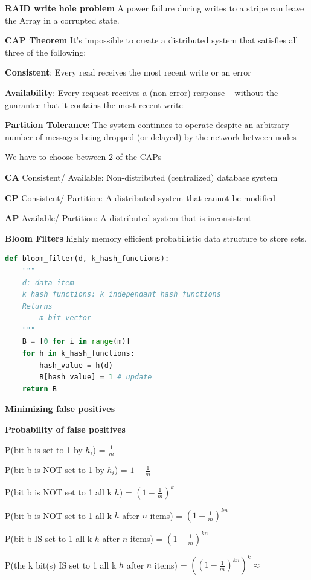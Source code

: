 \documentclass[a4paper,12pt]{article}
\begin{document}
\bigskip
\textbf{RAID write hole problem} A power failure during writes to a stripe can leave the Array
in a corrupted state.

\bigskip
\textbf{CAP Theorem} It's impossible to create a distributed system that satisfies all three of
the following:

\textbf{Consistent}: Every read receives the most recent write or an error

\textbf{Availability}: Every request receives a (non-error) response – without the guarantee that it contains the most recent write

\textbf{Partition Tolerance}: The system continues to operate despite an arbitrary number of messages being dropped (or delayed) by the network between nodes

\bigskip
We have to choose between 2 of the CAPs

\textbf{CA} Consistent/ Available: Non-distributed (centralized) database system

\textbf{CP} Consistent/ Partition: A distributed system that cannot be modified

\textbf{AP} Available/ Partition: A distributed system that is inconsistent

\bigskip
\textbf{Bloom Filters} highly memory efficient probabilistic data structure to store sets.
\begin{lstlisting}[language=Python]
def bloom_filter(d, k_hash_functions):
    """
    d: data item
    k_hash_functions: k independant hash functions
    Returns
        m bit vector 
    """
    B = [0 for i in range(m)]
    for h in k_hash_functions:
        hash_value = h(d)
        B[hash_value] = 1 # update
    return B          
\end{lstlisting}
\textbf{Minimizing false positives}

\textbf{Probability of false positives}

P(bit b is set to 1 by $h_i$) = $\frac{1}{m}$

P(bit b is NOT set to 1 by $h_i$) = $1 - \frac{1}{m}$

P(bit b is NOT set to 1 all k $h$) = $(1 - \frac{1}{m})^k$

P(bit b is NOT set to 1 all k $h$ after $n$ items) = $(1 - \frac{1}{m})^{kn}$

P(bit b IS set to 1 all k $h$ after $n$ items) = $(1 - \frac{1}{m})^{kn}$

P(the k bit(s) IS set to 1 all k $h$ after $n$ items) = $((1 - \frac{1}{m})^{kn})^k \approx$
\end{document}
